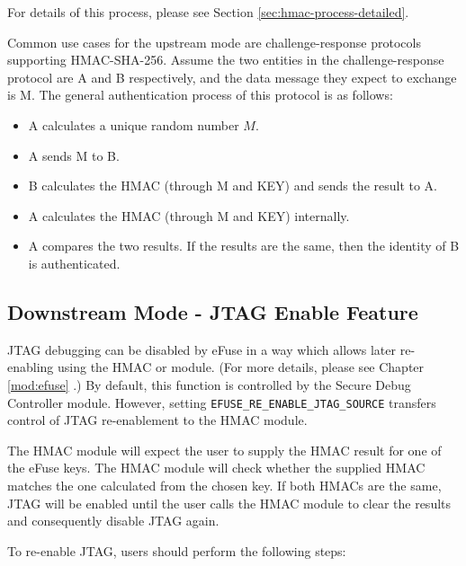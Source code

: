 \documentclass[main\_\_EN.tex]{subfiles}
\begin{document}
For details of this process, please see Section \ref{sec:hmac-process-detailed}.

\begin{tiplisting}
Common use cases for the upstream mode are challenge-response protocols supporting HMAC-SHA-256. Assume the two entities in the challenge-response protocol are A and B respectively, and the data message they expect to exchange is M. The general authentication process of this protocol is as follows:

\begin{itemize}
    \item A calculates a unique random number $M$.
    \item A sends M to B.
    \item B calculates the HMAC (through M and KEY) and sends the result to A.
    \item A calculates the HMAC (through M and KEY) internally.
    \item A compares the two results. If the results are the same, then the identity of B is authenticated.
\end{itemize}
\end{tiplisting}

\subsection{Downstream Mode - JTAG Enable Feature}

JTAG debugging can be disabled by eFuse in a way which allows later re-enabling using the HMAC or \textit{} module. (For more details, please see Chapter \ref{mod:efuse} \textit{}.) By default, this function is controlled by the Secure Debug Controller module. However, setting \texttt{EFUSE\_RE\_ENABLE\_JTAG\_SOURCE} transfers control of JTAG re-enablement to the HMAC module.

The HMAC module will expect the user to supply the HMAC result for one of the eFuse keys. The HMAC module will check whether the supplied HMAC matches the one calculated from the chosen key. If both HMACs are the same, JTAG will be enabled until the user calls the HMAC module to clear the results and consequently disable JTAG again.

To re-enable JTAG, users should perform the following steps:
\end{document}
